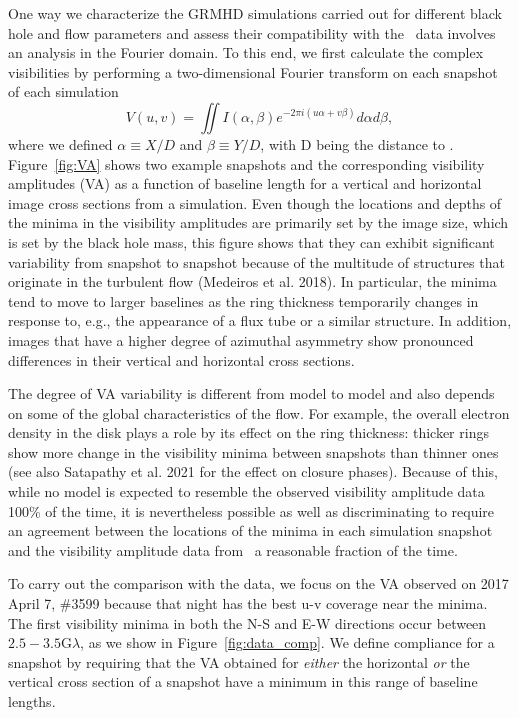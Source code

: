 One way we characterize the GRMHD simulations carried out for
different black hole and flow parameters and assess their
compatibility with the \sgra\ data involves an analysis in the Fourier
domain.
To this end, we first calculate the complex visibilities by performing
a two-dimensional Fourier transform on each snapshot of each
simulation
\begin{equation}
  V(u,v) = \iint I(\alpha,\beta) e^{-2\pi i(u\alpha+v\beta)}d\alpha d\beta,
\end{equation}
where we defined $\alpha \equiv X/D$ and $\beta \equiv Y/D$, with D
being the distance to \sgra.
Figure~\ref{fig:VA} shows two example snapshots and the corresponding
visibility amplitudes (VA) as a function of baseline length for a
vertical and horizontal image cross sections from a simulation.
Even though the locations and depths of the minima in the visibility
amplitudes are primarily set by the image size, which is set by the
black hole mass, this figure shows that they can exhibit significant
variability from snapshot to snapshot because of the multitude of
structures that originate in the turbulent flow (Medeiros et
al. 2018).
In particular, the minima tend to move to larger baselines as the ring
thickness temporarily changes in response to, e.g., the appearance of
a flux tube or a similar structure.
In addition, images that have a higher degree of azimuthal asymmetry
show pronounced differences in their vertical and horizontal cross
sections.

The degree of VA variability is different from model to model and also
depends on some of the global characteristics of the flow.
For example, the overall electron density in the disk plays a role by
its effect on the ring thickness: thicker rings show more change in
the visibility minima between snapshots than thinner ones (see also
Satapathy et al. 2021 for the effect on closure phases).
Because of this, while no model is expected to resemble the observed
visibility amplitude data 100\% of the time, it is nevertheless
possible as well as discriminating to require an agreement between the
locations of the minima in each simulation snapshot and the visibility
amplitude data from \sgra\ a reasonable fraction of the time.

To carry out the comparison with the data, we focus on the VA observed
on 2017 April 7, \#3599 because that night has the best u-v coverage
near the minima.
The first visibility minima in both the N-S and E-W directions occur
between $2.5-3.5$\;G$\lambda$, as we show in
Figure~\ref{fig:data_comp}.
We define compliance for a snapshot by requiring that the VA obtained
for {\it either} the horizontal {\it or} the vertical cross section of
a snapshot have a minimum in this range of baseline lengths.

